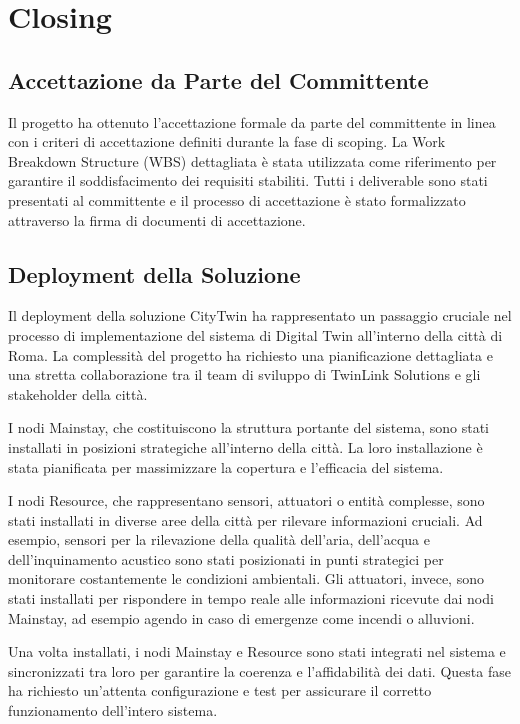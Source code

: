 \chapter{Closing}

\section{Accettazione da Parte del Committente}
Il progetto ha ottenuto l'accettazione formale da parte del committente in linea con i criteri di accettazione definiti durante la fase di scoping. La Work Breakdown Structure (WBS) dettagliata è stata utilizzata come riferimento per garantire il soddisfacimento dei requisiti stabiliti. Tutti i deliverable sono stati presentati al committente e il processo di accettazione è stato formalizzato attraverso la firma di documenti di accettazione.

\section{Deployment della Soluzione}
Il deployment della soluzione CityTwin ha rappresentato un passaggio cruciale nel processo di implementazione del sistema di Digital Twin all'interno della città di Roma. La complessità del progetto ha richiesto una pianificazione dettagliata e una stretta collaborazione tra il team di sviluppo di TwinLink Solutions e gli stakeholder della città.

I nodi Mainstay, che costituiscono la struttura portante del sistema, sono stati installati in posizioni strategiche all'interno della città. La loro installazione è stata pianificata per massimizzare la copertura e l'efficacia del sistema.

I nodi Resource, che rappresentano sensori, attuatori o entità complesse, sono stati installati in diverse aree della città per rilevare informazioni cruciali. Ad esempio, sensori per la rilevazione della qualità dell'aria, dell'acqua e dell'inquinamento acustico sono stati posizionati in punti strategici per monitorare costantemente le condizioni ambientali. Gli attuatori, invece, sono stati installati per rispondere in tempo reale alle informazioni ricevute dai nodi Mainstay, ad esempio agendo in caso di emergenze come incendi o alluvioni.

Una volta installati, i nodi Mainstay e Resource sono stati integrati nel sistema e sincronizzati tra loro per garantire la coerenza e l'affidabilità dei dati. Questa fase ha richiesto un'attenta configurazione e test per assicurare il corretto funzionamento dell'intero sistema.

